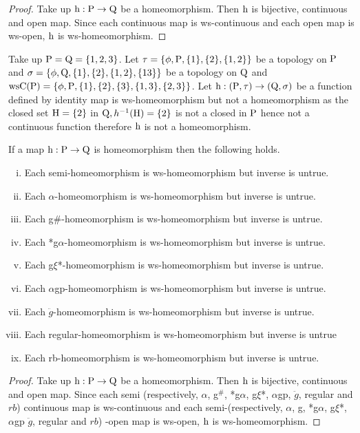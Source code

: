 \begin{proof}
Take up $\mathrm{h}: \mathrm{P}\to \mathrm{Q}$ be a homeomorphism. Then $\mathrm{h}$ is bijective, continuous and open map. Since each continuous map is ws-continuous and each open map is ws-open, $\mathrm{h}$ is ws-homeomorphism.
\end{proof}

\begin{exm}\label{exam5.2.4}
Take up $\mathrm{P}=\mathrm{Q}= \{1, 2, 3\}$. Let $\tau= \{\phi, \TSP, \{1\}, \{2\},\break \{1,2\}\}$ be a topology on $\mathrm{P}$  and $\sigma=\{\phi, \mathrm{Q}, \{1\}, \{2\}, \{1, 2\}, \{1 3\}\}$ be a topology on $\mathrm{Q}$ and $\mathrm{ws}\mathrm{C}(\mathrm{P})= \{\phi, \mathrm{P}, \{1\}, \{2\},\{3\}, \{1,3\},\{2, 3\}\}$. Let $\mathrm{h}: (\mathrm{P}, \tau )\to (\mathrm{Q}, \sigma)$ be a function defined by identity map is ws-homeomorphism but not a homeomorphism as the closed set $\mathrm{H}=\{2\}$ in $\mathrm{Q}, h^{-1} (\mathrm{H})=\{2\}$ is not a closed in $\mathrm{P}$ hence not a continuous function therefore $\mathrm{h}$ is not a homeomorphism.
\end{exm}

\begin{thm}\label{thm5.2.5}
If a map $\mathrm{h}: \mathrm{P}\to \mathrm{Q}$ is homeomorphism then the following holds.
\begin{enumerate}[(i)]
\item Each semi-homeomorphism is ws-homeomorphism but inverse is untrue.
\item Each $\alpha$-homeomorphism is ws-homeomorphism but inverse is untrue.
\item Each g\#-homeomorphism is ws-homeomorphism but inverse is untrue.
\item Each *g$\alpha$-homeomorphism is ws-homeomorphism but inverse is untrue.
\item Each g$\xi$*-homeomorphism is ws-homeomorphism but inverse is untrue.
\item Each $\alpha$gp-homeomorphism is ws-homeomorphism but inverse is untrue.
\item Each $\ddot{g}$-homeomorphism is ws-homeomorphism but inverse is untrue.
\item Each regular-homeomorphism is ws-homeomorphism but inverse is untrue
\item Each rb-homeomorphism is ws-homeomorphism but inverse is untrue.
\end{enumerate}
\end{thm}

\begin{proof}
Take up $\mathrm{h}: \mathrm{P}\to \mathrm{Q}$ be a homeomorphism. Then $\mathrm{h}$ is bijective, continuous and open map. Since each semi (respectively, $\alpha$, g$^{\text{\#}}$, *g$\alpha$, g$\xi$*, $\alpha$gp, $\ddot{g}$, regular and $rb$) continuous map is ws-continuous and each semi-(respectively, $\alpha$, g, *g$\alpha$, g$\xi$*, $\alpha$gp $\ddot{g}$, regular and $rb$) -open map is ws-open, $\mathrm{h}$ is ws-homeomorphism.
\end{proof}

